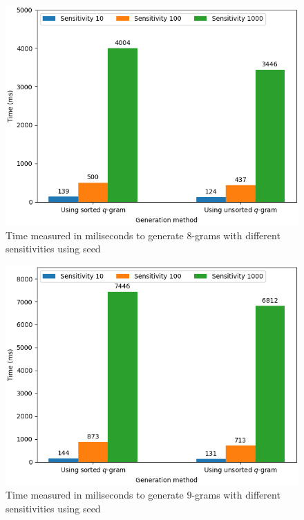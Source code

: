 \documentclass[twoside,a4paper,bsc]{master}
\newcommand{\Qgram}[1]{\(#1\)-gram}
\begin{document}
\begin{figure}
\centering
\includegraphics[scale=0.7]{graphics/gen_w8.png}
\caption{Time measured in miliseconds to generate \Qgram{8}s with
different sensitivities using seed }
\label{fig:speed8}
\end{figure}

\begin{figure}
\centering
\includegraphics[scale=0.7]{graphics/gen_w9.png}
\caption{Time measured in miliseconds to generate \Qgram{9}s with
different sensitivities using seed }
\label{fig:speed9}
\end{figure}
\end{document}
